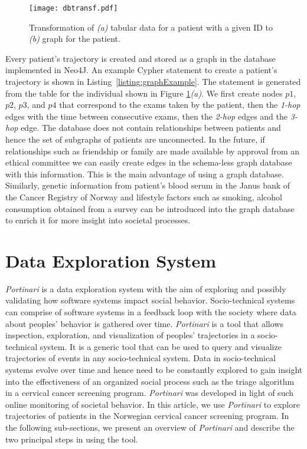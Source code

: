 \documentclass[10pt, conference]{IEEEtran}
\begin{document}
\begin{figure}[t]
\texttt{[image: dbtransf.pdf]}
\caption{Transformation of \textit{(a)} tabular data for a patient with a given ID to \textit{(b)} graph for the patient.}
\label{fig:dbtransf}
\end{figure}


Every patient's trajectory is created and stored as a graph in the database implemented in Neo4J. An example Cypher statement to create a patient's trajectory is shown in Listing~\ref{listing:graphExample}. The statement is
generated from the table for the individual shown in Figure \ref{fig:dbtransf}\textit{(a)}. We first create nodes $p1$, $p2$, $p3$, and $p4$ that correspond to the exams taken by the patient, then the \emph{1-hop} edges with the time between consecutive exams, then the \emph{2-hop} edges and the \emph{3-hop} edge. The database does not contain relationships between patients and hence the set of subgraphs of patients are unconnected. In the future, if relationships such as friendship or family are made available by approval from an ethical committee we can  easily create edges in the schema-less graph database with this information. This is the main advantage of using  a graph database. Similarly, genetic information from patient's blood serum in the Janus bank \cite{jellum1995experiences} of the Cancer Registry of Norway and lifestyle factors such as smoking, alcohol consumption obtained from a survey \cite{hansen2011factors} can be introduced into the graph database to enrich it for more insight into societal processes.





\section{Data Exploration System}
\label{sec:explore}

\textit{Portinari} is a data exploration system with the aim of exploring and possibly validating how software systems impact  social behavior. Socio-technical systems can comprise of software systems in a feedback loop with the society where data about peoples' behavior is gathered over time. \textit{Portinari} is a tool that allows inspection, exploration, and visualization of peoples' trajectories in a socio-technical system. It is a generic tool that can be used to query and visualize trajectories of events in any socio-technical  system. Data in socio-technical  systems evolve over time and hence need to be constantly explored to gain insight into the effectiveness of an organized social process such as the triage algorithm in a cervical cancer screening program. \textit{Portinari} was developed in light of such online monitoring of societal behavior.  In this article, we use \textit{Portinari} to explore trajectories of patients in the Norwegian cervical cancer screening  program. In the following sub-sections, we present an overview of \textit{Portinari} and describe the two principal steps in using the tool.
\end{document}
